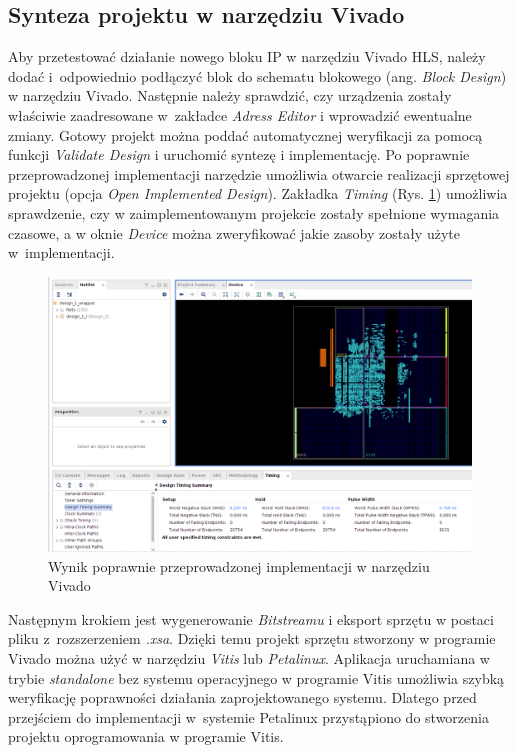 \subsection{Synteza projektu w narzędziu Vivado}

Aby przetestować działanie nowego bloku IP w narzędziu Vivado HLS, należy dodać i~odpowiednio podłączyć blok do 
schematu blokowego (ang. \emph{Block Design}) w narzędziu Vivado. Następnie należy sprawdzić, czy urządzenia zostały 
właściwie zaadresowane w~zakładce \emph{Adress Editor} i wprowadzić ewentualne zmiany. Gotowy projekt można poddać 
automatycznej weryfikacji za pomocą funkcji \emph{Validate Design} i uruchomić syntezę i implementację. Po poprawnie 
przeprowadzonej implementacji narzędzie umożliwia otwarcie realizacji sprzętowej projektu (opcja \emph{Open Implemented 
Design}). Zakładka \emph{Timing} (Rys. \ref{impl_design_vivado}) umożliwia sprawdzenie, czy w zaimplementowanym 
projekcie zostały spełnione wymagania czasowe, a w oknie \emph{Device} można zweryfikować jakie zasoby zostały użyte w~implementacji.

\begin{figure}[!h]
  \centering
  \includegraphics[width=\textwidth]{img/impl-design-vivado.png}
  \caption{Wynik poprawnie przeprowadzonej implementacji w narzędziu Vivado}
  \label{impl_design_vivado}
\end{figure}

Następnym krokiem jest wygenerowanie \emph{Bitstreamu} i eksport sprzętu w postaci pliku z~rozszerzeniem \emph{.xsa}.
Dzięki temu projekt sprzętu stworzony w programie Vivado można użyć w narzędziu \emph{Vitis} 
lub \emph{Petalinux}. Aplikacja uruchamiana w trybie \emph{standalone} bez systemu operacyjnego w programie Vitis 
umożliwia szybką weryfikację poprawności działania zaprojektowanego systemu. Dlatego przed przejściem do implementacji 
w~systemie Petalinux przystąpiono do stworzenia projektu oprogramowania w programie Vitis.

